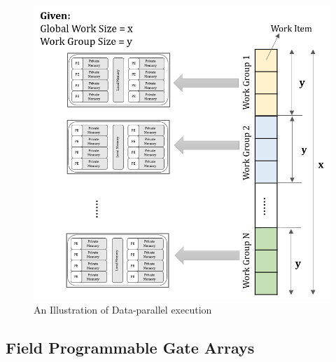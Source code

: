 \begin{figure}[h!]
  \centering
  \includegraphics[width=0.70\linewidth]{figures/openCL_workSchedule.png}
  \caption{An Illustration of Data-parallel execution
  \cite{opencl_ajg}}
  \label{fig:openCL_workSchedule}
\end{figure}

\subsection{Field Programmable Gate Arrays}
\label{2_3_2}

